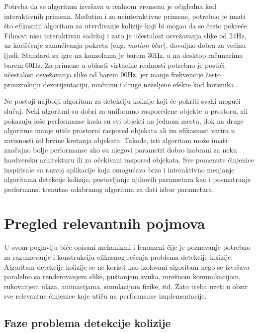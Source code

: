 \documentclass[12pt,oneside]{memoir}
\begin{document}
Potreba da se algoritam izvršava u realnom vremenu je očigledna kod interaktivnih primena.
Međutim i za neinteraktivne primene, potrebno je imati što efikasniji algoritam za utvrđivanje kolizije koji bi mogao da se često pokreće.
Filmovi nisu interaktivan sadržaj i zato je učestalost osvežavanja slike od 24Hz, uz korišćenje zamućivanja pokreta (eng. {\em motion blur}),
dovoljno dobra za većinu ljudi. Standard za igre na konzolama je barem 30Hz, a na desktop računarima  barem 60Hz. 
Za primene u oblasti virtuelne realnosti potrebno je postići učestalost osvežavanja slike od barem 90Hz, jer manje frekvencije često prouzrokuju
dezorijentaciju, mučninu i druge neželjene efekte kod korisnika \cite{importance}.

Ne postoji najbolji algoritam za detekciju kolizije koji će pokriti svaki mogući slučaj. 
Neki algoritmi su dobri za uniformno raspoređene objekte u prostoru, ali pokazuju loše performanse kada su svi objekti na jednom mestu, 
dok na druge algoritme manje utiče prostorni raspored objekata ali im efikasnost varira u zavisnosti od brzine kretanja objekata.
Takođe, isti algoritam može imati značajno bolje performanse ako su njegovi parametri dobro 
izabrani za neku hardversku arhitekturu ili za očekivani raspored objekata. 
Sve pomenute činjenice inspirisale su razvoj aplikacije koja omogućava brzo i interaktivno menjanje
algoritama detekcije kolizije, postavljanje njihovih parametara kao 
i  posmatranje performansi trenutno odabranog algoritma za dati izbor parametara.

\chapter{Pregled relevantnih pojmova}
\label{sec:karakteristike}

U ovom poglavlju biće opisani mehanizmi i fenomeni čije je poznavanje potrebno za razumevanje i konstrukciju 
efikasnog rešenja problema detekcije kolizije.
Algoritam detekcije kolizije se ne koristi kao izolovani algoritam nego se izvršava paralelno sa renderovanjem slike,
puštanjem zvuka, mrežnom komunikacijom, rukovanjem ulaza, animacijama, simulacijom fizike, itd. 
Zato treba uzeti u obzir sve relevantne činjenice koje utiču na performanse implementacije.

\section{Faze problema detekcije kolizije}
\end{document}
